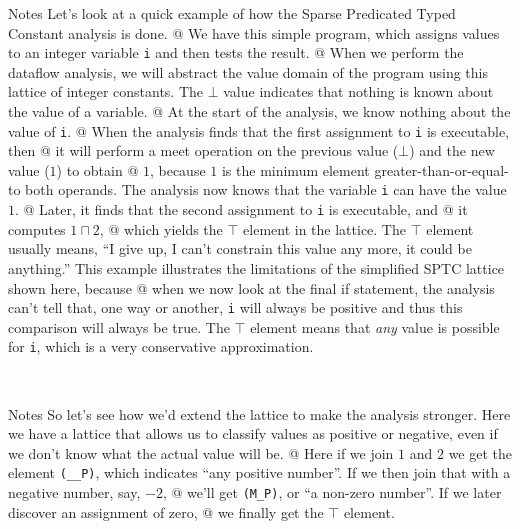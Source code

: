 \documentclass[%
pdf,
colorBG,
slideColor,
nototal,
oqe
]{prosper}
\newcommand{\meet}{\ensuremath{\sqcap}}
\newenvironment{talknotes}{\begin{slide}{Notes}\tiny}{\end{slide}}
\begin{document}
\begin{talknotes}
Let's look at a quick example of how the Sparse Predicated Typed
Constant analysis is done. @ We have this simple program, which
assigns values to an integer variable {\tt i} and then tests the
result.  @ When we perform the dataflow analysis, we will abstract the
value domain of the program using this lattice of integer
constants.  The $\bot$ value indicates that nothing is known about the
value of a variable. @ At the start of the analysis, we know nothing
about the value of {\tt i}. @ When the analysis finds that the first
assignment to {\tt i} is executable, then @ it will perform a meet
operation on the previous value ($\bot$) and the new value ($1$) to
obtain @ $1$, because $1$ is the minimum element
greater-than-or-equal-to both operands.  The analysis now knows that
the variable {\tt i} can have the value $1$. @ Later, it finds that
the second assignment to {\tt i} is executable, and @ it computes
$1 \meet 2$, @ which yields the $\top$ element in the lattice.
The $\top$ element usually means, ``I give up, I can't constrain
this value any more, it could be anything.''  This example illustrates
the limitations of the simplified SPTC lattice shown here, because @
when we now look at the final if statement, the analysis can't tell
that, one way or another, {\tt i} will always be positive and thus
this comparison will always be true.  The $\top$ element means that
\emph{any} value is possible for {\tt i}, which is a very conservative
approximation.

~%
\end{talknotes}


\begin{talknotes}
So let's see how we'd extend the lattice to make the analysis
stronger.  Here we have a lattice that allows us to classify
values as positive or negative, even if we don't know what the
actual value will be. @ Here if we join $1$ and $2$ we get the
element {\tt (\_\_P)}, which indicates ``any positive number''.
If we then join that with a negative number, say, $-2$, @ we'll
get {\tt (M\_P)}, or ``a non-zero number''.  If we later discover
an assignment of zero, @ we finally get the $\top$ element.
\end{talknotes}
\end{document}

